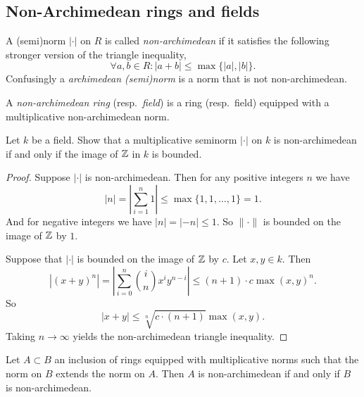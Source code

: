 \subsection{Non-Archimedean rings and fields} \label{sec:non-archimedean_rings_and_fields}
\begin{definition}
	A (semi)norm $|\cdot |$ on $R$ is called \emph{non-archimedean} if it satisfies the following stronger version of the triangle inequality, \[
	\forall a, b \in R: |a + b| \le \max \{|a|, |b|\} 
	.\] 
	Confusingly a \emph{archimedean (semi)norm} is a norm that is not non-archimedean.
\end{definition}

\begin{definition}
	A \emph{non-archimedean ring} (resp.\ \emph{field}) is a ring (resp.\ field) equipped with a multiplicative non-archimedean norm. 
\end{definition}

\begin{exercise}
	Let $k$ be a field.
	Show that a multiplicative seminorm $|\cdot |$ on $k$ is non-archimedean if and only if the image of $\mathbb{Z}$ in $k$ is bounded. 
\end{exercise}
\begin{proof}
	Suppose $|\cdot |$ is non-archimedean. Then for any positive integers $n$ we have \[
	|n| = \left|\sum_{i = 1}^{n} 1 \right| \le \max \{1, 1, \ldots, 1\}  = 1
	.\] 
	And for negative integers we have $|n| = |-n| \le 1$. So $\|\cdot \|$ is bounded on the image of $\mathbb{Z}$ by $1$. 


	Suppose that $|\cdot |$ is bounded on the image of $\mathbb{Z}$ by $c$. 
	Let $x, y \in k$. Then \[
		|(x + y)^{n}| = \left| \sum_{i = 0}^{n} \binom{i}{n} x ^{i} y ^{n-i}\right| \le (n + 1)\cdot c \max(x, y)^{n}
	.\] 
	So \[
		|x + y| \le \sqrt[n]{c\cdot (n + 1)}  \max(x, y)
	.\] 
	Taking $n \to \infty$ yields the non-archimedean triangle inequality. 
\end{proof}

\begin{corollary}
	Let $A \subset  B$ an inclusion of rings  equipped with multiplicative norms such that the norm on $B$ extends the norm on $A$. 
	Then $A$ is non-archimedean if and only if $B$ is non-archimedean. 
\end{corollary}

